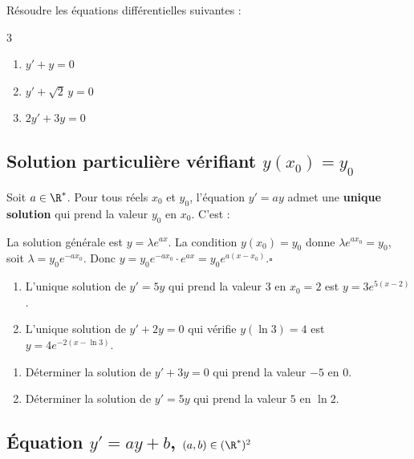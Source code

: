 \begin{Application}
R\'esoudre les \'equations diff\'erentielles suivantes :
\begin{multicols}{3}
\begin{enumerate}
  \item $y'+y=0$
  \item $y'+\sqrt{2}\,y=0$
  \item $2y'+3y=0$
\end{enumerate}
\end{multicols}
\end{Application}

\subsection{Solution particuli\`ere v\'erifiant $y(x_0)=y_0$}

\begin{Propriete}[]{}
Soit $a\in\R^*$. Pour tous r\'eels $x_0$ et $y_0$, l'\'equation $y'=ay$
admet une \textbf{unique solution} qui prend la valeur $y_0$ en $x_0$.
C'est :
\end{Propriete}

\DemoTex La solution g\'en\'erale est $y=\lambda e^{ax}$.
La condition $y(x_0)=y_0$ donne $\lambda e^{ax_0}=y_0$, soit $\lambda=y_0 e^{-ax_0}$.
Donc $y=y_0 e^{-ax_0}\cdot e^{ax}=y_0 e^{a(x-x_0)}$.\hfill$\square$

\Exemples
\begin{enumerate}
  \item L'unique solution de $y'=5y$ qui prend la valeur $3$ en $x_0=2$ est
        $y=3e^{5(x-2)}$.
  \item L'unique solution de $y'+2y=0$ qui v\'erifie $y(\ln 3)=4$ est
        $y=4e^{-2(x-\ln 3)}$.
\end{enumerate}

\begin{Application}
\begin{enumerate}
  \item D\'eterminer la solution de $y'+3y=0$ qui prend la valeur $-5$ en $0$.
  \item D\'eterminer la solution de $y'=5y$ qui prend la valeur $5$ en $\ln 2$.
\end{enumerate}
\end{Application}

\subsection{\'Equation $y'=ay+b$, $(a,b)\in(\R^*)^2$}

